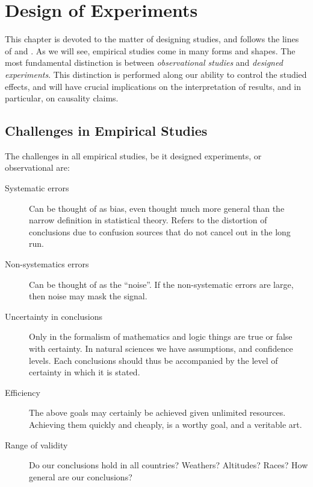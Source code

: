 \chapter{Design of Experiments}
\label{ch:doe}


This chapter is devoted to the matter of designing studies, and follows the lines of \cite{cox_theory_2000} and \cite{cox_principles_2011}.
As we will see, empirical studies come in many forms and shapes. 
The most fundamental distinction is between \emph{observational studies} and \emph{designed experiments}.
This distinction is performed along our ability to control the studied effects, and will have crucial implications on the interpretation of results, and in particular, on causality claims. 




\section{Challenges in Empirical Studies}

The challenges in all empirical studies, be it designed experiments, or observational are:
\begin{description}
	\item [Systematic errors] 
	Can be thought of as bias, even thought much more general than the narrow definition in statistical theory. 
	Refers to the distortion of conclusions due to confusion sources that do not cancel out in the long run. 
	\item [Non-systematics errors]
	Can be thought of as the ``noise''. 
	If the non-systematic errors are large, then noise may mask the signal. 
	\item [Uncertainty in conclusions]
	Only in the formalism of mathematics and logic things are true or false with certainty. 
	In natural sciences we have assumptions, and confidence levels.
	Each conclusions should thus be accompanied by the level of certainty in which it is stated. 	
	\item [Efficiency]
	The above goals may certainly be achieved given unlimited resources. 
	Achieving them quickly and cheaply, is a worthy goal, and a veritable art. 	
	\item [Range of validity]
	Do our conclusions hold in all countries? Weathers? Altitudes? Races? 
	How general are our conclusions? 	
\end{description}




